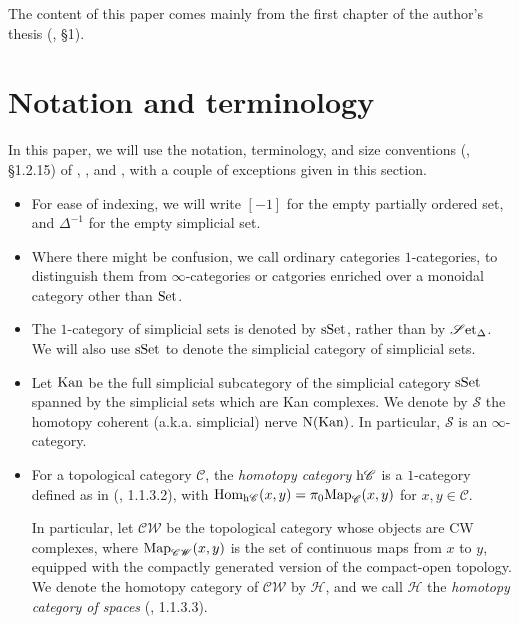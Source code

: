 \documentclass{tac}
\newcommand{\s}[1]{\mathscr{#1}}
\newcommand{\tx}[1]{\textnormal{#1}}
\begin{document}
The content of this paper comes mainly from the first chapter of the author's thesis (\cite{thesis}, \S 1).

\section{Notation and terminology}

In this paper, we will use the notation, terminology, and size conventions (\cite{htt}, \S 1.2.15) of \cite{htt}, \cite{ha}, and \cite{kerodon}, with a couple of exceptions given in this section.  
\begin{itemize}
\item For ease of indexing, we will write $[-1]$ for the empty partially ordered set, and $\Delta^{-1}$ for the empty simplicial set.
\item Where there might be confusion, we call ordinary categories $1$-categories, to distinguish them from $\infty$-categories or catgories enriched over a monoidal category other than $\tx{Set}$.
\item The $1$-category of simplicial sets is denoted by $\tx{sSet}$, rather than by $\s{S}\tx{et}_\Delta$.  We will also use $\tx{sSet}$ to denote the simplicial category of simplicial sets.
\item Let $\tx{Kan}$ be the full simplicial subcategory of the simplicial category $\tx{sSet}$ spanned by the simplicial sets which are Kan complexes.  We denote by $\s{S}$ the homotopy coherent (a.k.a. simplicial) nerve $\tx{N}(\tx{Kan})$.  In particular, $\s{S}$ is an $\infty$-category.
\item For a topological category $\s{C}$, the \emph{homotopy category} $\tx{h}\s{C}$ is a $1$-category defined as in (\cite{htt}, 1.1.3.2), with $\tx{Hom}_{\tx{h}\s{C}} (x,y) = \pi_0 \tx{Map}_\s{C} (x,y)$ for $x,y\in \s{C}$.  

In particular, let $\s{{CW}}$ be the topological category whose objects are CW complexes, where $\tx{Map}_{\s{{CW}}} (x,y)$ is the set of continuous maps from $x$ to $y$, equipped with the compactly generated version of the compact-open topology.  We denote the homotopy category of $\s{{CW}}$ by $\s{H}$, and we call $\s{H}$ the \emph{homotopy category of spaces} (\cite{htt}, 1.1.3.3).
\end{itemize}
\end{document}
